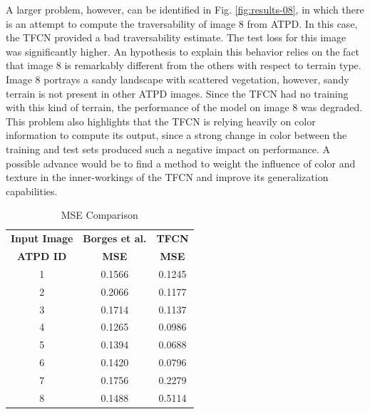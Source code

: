 \documentclass[conference]{IEEEtran}
\begin{document}
A larger problem, however, can be identified in Fig. \ref{fig:results-08}, in which there is an attempt to compute the traversability of image 8 from ATPD.
In this case, the TFCN provided a bad traversability estimate.
The test loss for this image was significantly higher.
An hypothesis to explain this behavior relies on the fact that image 8 is remarkably different from the others with respect to terrain type.
Image 8 portrays a sandy landscape with scattered vegetation, however, sandy terrain is not present in other ATPD images.
Since the TFCN had no training with this kind of terrain, the performance of the model on image 8 was degraded.
This problem also highlights that the TFCN is relying heavily on color information to compute its output, since a strong change in color between the training and test sets produced such a negative impact on performance.
A possible advance would be to find a method to weight the influence of color and texture in the inner-workings of the TFCN and improve its generalization capabilities.

\begin{table}[htbp]
\begin{center}
\caption{MSE Comparison}
\begin{tabular}{|c|c c|}
\hline
\textbf{Input Image} & \textbf{Borges et al.\cite{borges:2019}} & \textbf{TFCN} \\
\textbf{ATPD ID} & \textbf{MSE} & \textbf{MSE} \\
\hline
1 & 0.1566 & \cellcolor{blue!15} 0.1245 \\ %
2 & 0.2066 & \cellcolor{blue!15} 0.1177 \\ %
3 & 0.1714 & \cellcolor{blue!15} 0.1137 \\ %
4 & 0.1265 & \cellcolor{blue!15} 0.0986 \\ %
5 & 0.1394 & \cellcolor{blue!15} 0.0688 \\ %
6 & 0.1420 & \cellcolor{blue!15} 0.0796 \\ %
7 & \cellcolor{blue!15} 0.1756 & 0.2279 \\ %
8 & \cellcolor{blue!15} 0.1488 & 0.5114 \\ \hline
\end{tabular}
\label{tab:comparison-mse}
\end{center}
\end{table}
\end{document}
